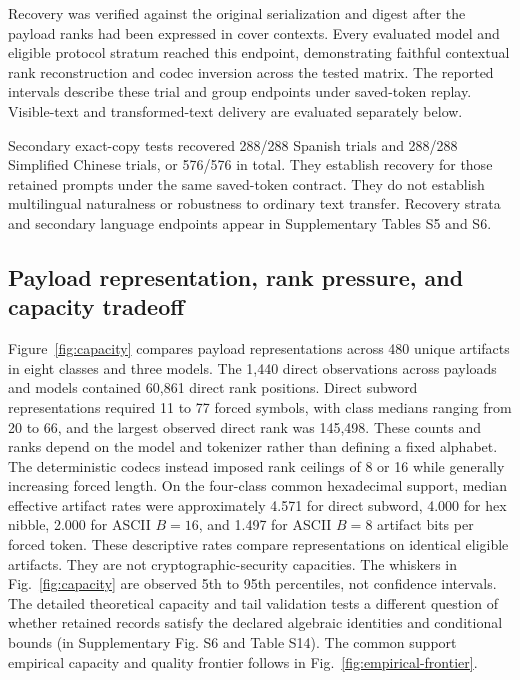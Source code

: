 \documentclass[fleqn,10pt]{wlscirep}
\begin{document}
Recovery was verified against the original serialization and digest after the payload ranks had been expressed in cover contexts. Every evaluated model and eligible protocol stratum reached this endpoint, demonstrating faithful contextual rank reconstruction and codec inversion across the tested matrix. The reported intervals describe these trial and group endpoints under saved-token replay. Visible-text and transformed-text delivery are evaluated separately below.

Secondary exact-copy tests recovered 288/288 Spanish trials and 288/288 Simplified Chinese trials, or 576/576 in total. They establish recovery for those retained prompts under the same saved-token contract. They do not establish multilingual naturalness or robustness to ordinary text transfer. Recovery strata and secondary language endpoints appear in Supplementary Tables S5 and S6.



\subsection*{Payload representation, rank pressure, and capacity tradeoff}\label{sec:results-capacity}

Figure~\ref{fig:capacity} compares payload representations across 480 unique artifacts in eight classes and three models. The 1,440 direct observations across payloads and models contained 60,861 direct rank positions. Direct subword representations required 11 to 77 forced symbols, with class medians ranging from 20 to 66, and the largest observed direct rank was 145,498. These counts and ranks depend on the model and tokenizer rather than defining a fixed alphabet.
The deterministic codecs instead imposed rank ceilings of 8 or 16 while generally increasing forced length. On the four-class common hexadecimal support, median effective artifact rates were approximately 4.571 for direct subword, 4.000 for hex nibble, 2.000 for ASCII \(B=16\), and 1.497 for ASCII \(B=8\) artifact bits per forced token. These descriptive rates compare representations on identical eligible artifacts. They are not cryptographic-security capacities.
The whiskers in Fig.~\ref{fig:capacity} are observed 5th to 95th percentiles, not confidence intervals. The detailed theoretical capacity and tail validation tests a different question of whether retained records satisfy the declared algebraic identities and conditional bounds (in Supplementary Fig. S6 and Table S14). The common support empirical capacity and quality frontier follows in Fig.~\ref{fig:empirical-frontier}.
\end{document}
